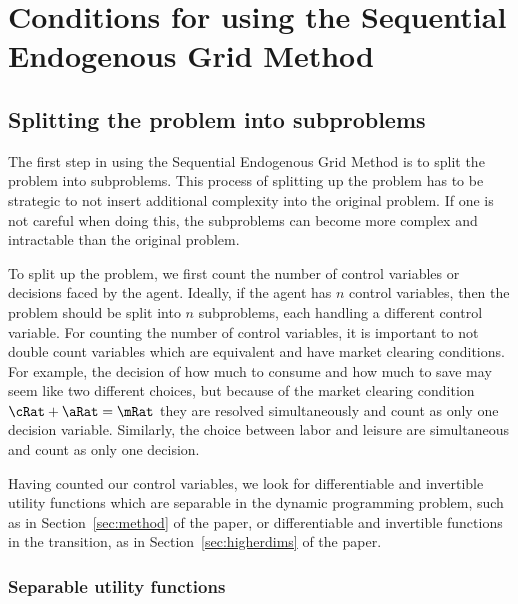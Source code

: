 \documentclass[\econtexRoot/SequentialEGM]{subfiles}
\begin{document}
\hypertarget{conditions}{}
\par\section{Conditions for using the Sequential Endogenous Grid Method}
\notinsubfile{\label{sec:conditions}}

\subsection{Splitting the problem into subproblems}

The first step in using the Sequential Endogenous Grid Method is to split the problem into subproblems. This process of splitting up the problem has to be strategic to not insert additional complexity into the original problem. If one is not careful when doing this, the subproblems can become more complex and intractable than the original problem.


To split up the problem, we first count the number of control variables or decisions faced by the agent. Ideally, if the agent has $n$ control variables, then the problem should be split into $n$ subproblems, each handling a different control variable. For counting the number of control variables, it is important to not double count variables which are equivalent and have market clearing conditions. For example, the decision of how much to consume and how much to save may seem like two different choices, but because of the market clearing condition $\cRat + \aRat = \mRat$ they are resolved simultaneously and count as only one decision variable. Similarly, the
choice between labor and leisure are simultaneous and count as only one decision.

Having counted our control variables, we look for differentiable and invertible utility functions which are separable in the dynamic programming problem, such as in Section~\ref{sec:method} of the paper, or differentiable and invertible functions in the transition, as in Section~\ref{sec:higherdims} of the paper.


\subsubsection{Separable utility functions}
\end{document}

